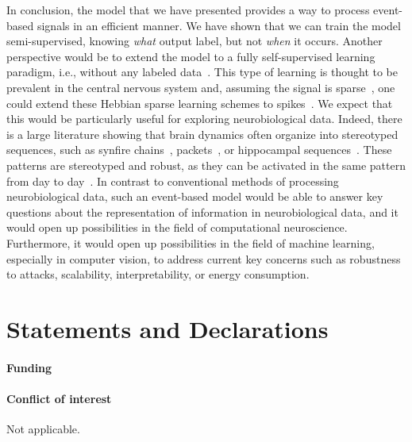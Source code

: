 \documentclass[default]{sn-jnl}%
\theoremstyle{thmstyleone}%
\theoremstyle{thmstyletwo}%
\theoremstyle{thmstylethree}%
\begin{document}
In conclusion, the model that we have presented provides a way to process event-based signals in an efficient manner. We have shown that we can train the model semi-supervised, knowing \emph{what} output label, but not \emph{when} it occurs. Another perspective would be to extend the model to a fully self-supervised learning paradigm, i.e., without any labeled data~\citep{barlow_unsupervised_1989}. This type of learning is thought to be prevalent in the central nervous system and, assuming the signal is sparse~\citep{olshausen_emergence_1996}, one could extend these Hebbian sparse learning schemes to spikes~\citep{perrinet_emergence_2004, masquelier_competitive_2009}. We expect that this would be particularly useful for exploring neurobiological data. Indeed, there is a large literature showing that brain dynamics often organize into stereotyped sequences, such as synfire chains~\citep{ikegaya_synfire_2004}, packets~\citep{luczak_sequential_2007}, or hippocampal sequences~\citep{pastalkova_internally_2008, villette_internally_2015}. These patterns are stereotyped and robust, as they can be activated in the same pattern from day to day~\citep{haimerl_internal_2019}. In contrast to conventional methods of processing neurobiological data, such an event-based model would be able to answer key questions about the representation of information in neurobiological data, and it would open up possibilities in the field of computational neuroscience. Furthermore, it would open up possibilities in the field of machine learning, especially in computer vision, to address current key concerns such as robustness to attacks, scalability, interpretability, or energy consumption.
%
\backmatter
%
%
\Acknowledgments
%

\section*{Statements and Declarations}

\paragraph{Funding}

\Funding %

\paragraph{Conflict of interest}
Not applicable.
\end{document}
